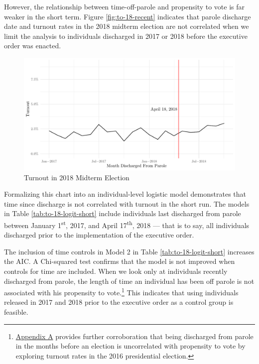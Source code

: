 \documentclass[
  12pt,
]{article}
\begin{document}
However, the relationship between time-off-parole and propensity to vote is far weaker in the short term. Figure \ref{fig:to-18-recent} indicates that parole discharge date and turnout rates in the 2018 midterm election are not correlated when we limit the analysis to individuals discharged in 2017 or 2018 before the executive order was enacted.

\begin{figure}[H]

{\centering \includegraphics{felony_disenfranchisement_nys_files/figure-latex/to-18-recent-chart-1} 

}

\caption{\label{fig:to-18-recent}Turnout in 2018 Midterm Election}\label{fig:to-18-recent-chart}
\end{figure}

Formalizing this chart into an individual-level logistic model demonstrates that time since discharge is not correlated with turnout in the short run. The models in Table \ref{tab:to-18-logit-short} include individuals last discharged from parole between January 1\textsuperscript{st}, 2017, and April 17\textsuperscript{th}, 2018 --- that is to say, all individuals discharged prior to the implementation of the executive order.



The inclusion of time controls in Model 2 in Table \ref{tab:to-18-logit-short} increases the AIC. A Chi-squared test confirms that the model is not improved when controls for time are included. When we look only at individuals recently discharged from parole, the length of time an individual has been off parole is not associated with his propensity to vote.\footnote{\protect\hyperlink{appendix-a}{Appendix A} provides further corroboration that being discharged from parole in the months before an election is uncorrelated with propensity to vote by exploring turnout rates in the 2016 presidential election.} This indicates that using individuals released in 2017 and 2018 prior to the executive order as a control group is feasible.
\end{document}
